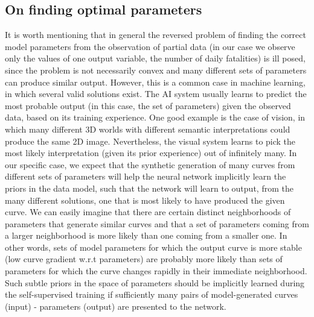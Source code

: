 \documentclass[11pt]{article}
\begin{document}
\subsection{On finding optimal parameters} \label{section:optimality}

It is worth mentioning that in general the reversed problem of finding the correct model parameters from the observation of partial data (in our case we observe only the values of one output variable, the number of daily fatalities) is ill posed, since the problem is not necessarily convex and many different sets of parameters can produce similar output. However, this is a common case in machine learning, in which several valid solutions exist. The AI system usually learns to predict the most probable output (in this case, the set of parameters) given the observed data, based on its training experience. One good example is the case of vision, in which many different 3D worlds with different semantic interpretations could produce the same 2D image. Nevertheless, the visual system learns to pick the most likely interpretation (given its prior experience) out of infinitely many. In our specific case, we expect that the synthetic generation of many curves from different sets of parameters will help the neural network implicitly learn the priors in the data model, such that the network will learn to output, from the many different solutions, one that is most likely to have produced the given curve. We can easily imagine that there are certain distinct neighborhoods of parameters that generate similar curves and that a set of parameters coming from a larger neighborhood is more likely than one coming from a smaller one. In other words, sets of model parameters for which the output curve is more stable (low curve gradient w.r.t parameters) are probably more likely than sets of parameters for which the curve changes rapidly in their immediate neighborhood. Such subtle priors in the space of parameters should be implicitly learned during the self-supervised training if sufficiently many pairs of model-generated curves (input) - parameters (output) are presented to the network.
\end{document}
